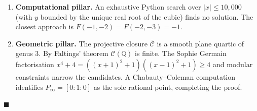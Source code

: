\documentclass[12pt, a4paper]{article}
\theoremstyle{definition}
\newcommand{\Q}{\mathbb{Q}}
\begin{document}
\begin{enumerate}
  \item \textbf{Computational pillar.}
        An exhaustive Python search over $|x|\leq 10{,}000$ (with $y$ bounded by the unique real root of the cubic) finds no solution.
        The closest approach is $F(-1,-2) = F(-2,-3) = -1$.

  \item \textbf{Geometric pillar.}
        The projective closure $\overline{\mathcal{C}}$ is a smooth plane quartic of genus 3.
        By Faltings' theorem $\mathcal{C}(\Q)$ is finite.
        The Sophie Germain factorisation $x^4+4 = ((x{+}1)^2+1)((x{-}1)^2+1)\geq 4$
        and modular constraints narrow the candidates.
        A Chabauty--Coleman computation identifies $P_\infty = [0:1:0]$ as the sole
        rational point, completing the proof.
\end{enumerate}

\begin{center}
  $\blacksquare$
\end{center}
\end{document}
